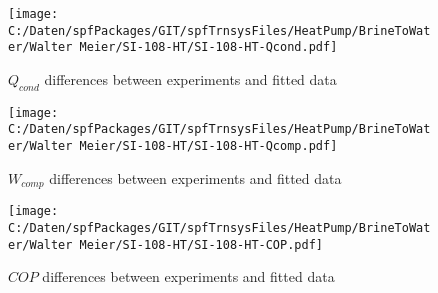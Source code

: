 \documentclass[english]{SPFShortReport}
\begin{document}
\begin{figure}[!ht]
\begin{center}
\texttt{[image: C:/Daten/spfPackages/GIT/spfTrnsysFiles/HeatPump/BrineToWater/Walter Meier/SI-108-HT/SI-108-HT-Qcond.pdf]}
\caption{$Q_{cond}$ differences between experiments and fitted data}
\label{QcongFig}
\end{center}
\end{figure}
\begin{figure}[!ht]
\begin{center}
\texttt{[image: C:/Daten/spfPackages/GIT/spfTrnsysFiles/HeatPump/BrineToWater/Walter Meier/SI-108-HT/SI-108-HT-Qcomp.pdf]}
\caption{$W_{comp}$ differences between experiments and fitted data}
\label{QcompFig}
\end{center}
\end{figure}
\begin{figure}[!ht]
\begin{center}
\texttt{[image: C:/Daten/spfPackages/GIT/spfTrnsysFiles/HeatPump/BrineToWater/Walter Meier/SI-108-HT/SI-108-HT-COP.pdf]}
\caption{$COP$ differences between experiments and fitted data}
\label{COPFig}
\end{center}
\end{figure}
\end{document}
